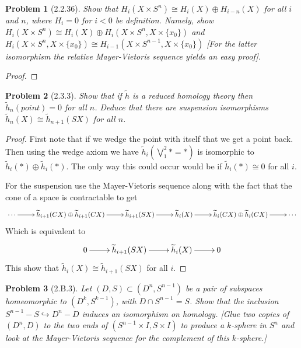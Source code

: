\documentclass[10pt]{article}
\newcommand{\sk}{\vskip 10mm}
\newcommand{\rh}{\widetilde{h}}
\theoremstyle{plain}
\newtheorem{problem}{Problem}
\theoremstyle{remark}
\begin{document}
\begin{problem}[2.2.36]
  Show that $H_i(X\times S^n)\cong H_i(X)\oplus H_{i-n}(X)$ for all $i$ and $n$,
  where $H_i=0$ for $i<0$ be definition. Namely, show
  $H_i(X\times S^n)\cong H_i(X)\oplus H_i(X\times S^n,X\times\{x_0\})$ and
  $H_i(X\times S^n,X\times\{x_0\})\cong H_{i-1}(X\times S^{n-1},X\times\{x_0\})$
  [For the latter isomorphism the relative Mayer-Vietoris sequence yields
  an easy proof].
\end{problem}

\begin{proof}
  
\end{proof}

\sk

\begin{problem}[2.3.3]
  Show that if $\rh$ is a reduced homology theory then $\rh_n(point)=0$ for all
  $n$. Deduce that there are suspension isomorphisms $\rh_n(X)\cong\rh_{n+1}(SX)$
  for all $n$.
\end{problem}

\begin{proof}
  First note that if we wedge the point with itself that we get a point back.
  Then using the wedge axiom we have $\rh_i(\bigvee_1^2*=*)$ is isomorphic to
  $\rh_i(*)\oplus\rh_i(*)$. The only way this could occur would be if $\rh_i(*)\cong 0$
  for all $i$.

  For the suspension use the Mayer-Vietoris sequence along with the
  fact that the cone of a space is contractable to get
  \[
    \xymatrix{
      \cdots \ar[r] & \rh_{i+1}(CX)\oplus \rh_{i+1}(CX) \ar[r] & \rh_{i+1}(SX) \ar[r] & \rh_i(X) \ar[r] & \rh_i(CX)\oplus \rh_i(CX) \ar[r] & \cdots
    }
  \]
  Which is equivalent to
  \[
    \xymatrix{
      0 \ar[r] & \rh_{i+1}(SX) \ar[r] & \rh_i(X) \ar[r] & 0
      }
  \]
  This show that $\rh_i(X)\cong\rh_{i+1}(SX)$ for all $i$.
\end{proof}

\sk

\begin{problem}[2.B.3]
  Let $(D,S)\subset (D^n,S^{n-1})$ be a pair of subspaces homeomorphic to
  $(D^k,S^{k-1})$, with $D\cap S^{n-1}=S$. Show that the inclusion
  $S^{n-1}-S\hookrightarrow D^n-D$ induces an isomorphism on homology. [Glue two
  copies of $(D^n,D)$ to the two ends of $(S^{n-1}\times I,S\times I)$ to
  produce a $k$-sphere in $S^n$ and look at the Mayer-Vietoris sequence for the
  complement of this $k$-sphere.]
\end{problem}
\end{document}
